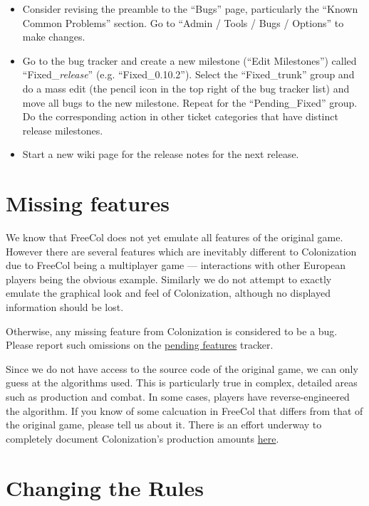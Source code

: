 \documentclass[12pt]{book}
\begin{document}
\begin{itemize}
\item Consider revising the preamble to the ``Bugs'' page,
  particularly the ``Known Common Problems'' section.  Go to ``Admin /
  Tools / Bugs / Options'' to make changes.

\item Go to the bug tracker and create a new milestone (``Edit
  Milestones'') called ``Fixed\_\emph{release}''
  (e.g. ``Fixed\_0.10.2'').  Select the ``Fixed\_trunk'' group and do
  a mass edit (the pencil icon in the top right of the bug tracker
  list) and move all bugs to the new milestone.  Repeat for the
  ``Pending\_Fixed'' group.  Do the corresponding action in other
  ticket categories that have distinct release milestones.

\item Start a new wiki page for the release notes for the next
  release.

\end{itemize}


\hypertarget{Missing features}{\chapter{Missing features}}

We know that FreeCol does not yet emulate all features of the original
game.  However there are several features which are inevitably
different to Colonization due to FreeCol being a multiplayer game ---
interactions with other European players being the obvious example.
Similarly we do not attempt to exactly emulate the graphical look and
feel of Colonization, although no displayed information should be lost.

Otherwise, any missing feature from Colonization is considered to be a
bug.  Please report such omissions on the
\href{https://sourceforge.net/p/freecol/pending-features-for-freecol/}{pending
  features} tracker.

Since we do not have access to the source code of the original game,
we can only guess at the algorithms used.  This is particularly true
in complex, detailed areas such as production and combat.  In some
cases, players have reverse-engineered the algorithm.  If you know of
some calcuation in FreeCol that differs from that of the original
game, please tell us about it.  There is an effort underway to
completely document Colonization's production amounts
\href{https://sourceforge.net/p/freecol/wiki/WWC1D\%20-\%20resource\%20output\%20v2/}{here}.


\hypertarget{Changing the Rules}{\chapter{Changing the Rules}}
\end{document}
